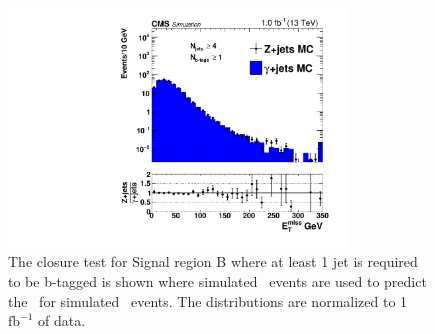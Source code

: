 \begin{figure}[!htb]
  \begin{center}
      \includegraphics[width=0.8\textwidth]{bkgd/figs/h_met_closure_rawMET_withb_SRB_novtxweight.pdf}
    \caption{
      The closure test for Signal region B where at least 1 jet is required to be b-tagged is shown
      where simulated \gjets\ events are used to predict the \MET\ for simulated \zjets\ events.
      The distributions are normalized to 1 $\mathrm{fb^{-1}}$ of data.
      \label{fig:SRB_withb_closure}
    }
  \end{center}
\end{figure}

